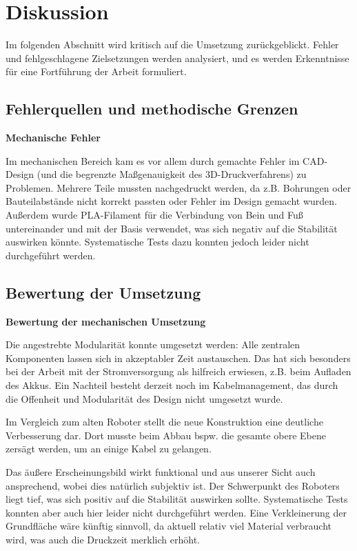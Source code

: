 \section{Diskussion}
\label{sec:diskussion}

Im folgenden Abschnitt wird kritisch auf die Umsetzung zurückgeblickt. Fehler und fehlgeschlagene Zielsetzungen werden analysiert, und es werden Erkenntnisse für eine Fortführung der Arbeit formuliert.

\subsection{Fehlerquellen und methodische Grenzen}

\textbf{Mechanische Fehler}

Im mechanischen Bereich kam es vor allem durch gemachte Fehler im CAD-Design (und die begrenzte Maßgenauigkeit des 3D-Druckverfahrens) zu Problemen. Mehrere Teile mussten nachgedruckt werden, da z.B. Bohrungen oder Bauteilabstände nicht korrekt passten oder Fehler im Design gemacht wurden. 
Außerdem wurde PLA-Filament für die Verbindung von Bein und Fuß untereinander und mit der Basis verwendet, was sich negativ auf die Stabilität auswirken könnte. Systematische Tests dazu konnten jedoch leider nicht durchgeführt werden.

\subsection{Bewertung der Umsetzung}

\textbf{Bewertung der mechanischen Umsetzung}

Die angestrebte Modularität konnte umgesetzt werden: Alle zentralen Komponenten lassen sich in akzeptabler Zeit austauschen. Das hat sich besonders bei der Arbeit mit der Stromversorgung als hilfreich erwiesen, z.B. beim Aufladen des Akkus. Ein Nachteil besteht derzeit noch im Kabelmanagement, das durch die Offenheit und Modularität des Design nicht umgesetzt wurde.

Im Vergleich zum alten Roboter stellt die neue Konstruktion eine deutliche Verbesserung dar. Dort musste beim Abbau bspw. die gesamte obere Ebene zersägt werden, um an einige Kabel zu gelangen.

Das äußere Erscheinungsbild wirkt funktional und aus unserer Sicht auch ansprechend, wobei dies natürlich subjektiv ist. Der Schwerpunkt des Roboters liegt tief, was sich positiv auf die Stabilität auswirken sollte. Systematische Tests konnten aber auch hier leider nicht durchgeführt werden. Eine Verkleinerung der Grundfläche wäre künftig sinnvoll, da aktuell relativ viel Material verbraucht wird, was auch die Druckzeit merklich erhöht. 

